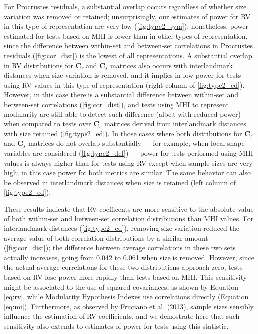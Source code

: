 \documentclass[12pt,]{article}
\begin{document}
For Procrustes residuals, a substantial overlap occurs regardless of
whether size variation was removed or retained; unsurprisingly, our
estimates of power for RV in this type of representation are very low
(\autoref{fig:type2_sym}); nonetheless, power estimated for tests based
on MHI is lower than in other types of representation, since the
difference between within-set and between-set correlations in Procrustes
residuals (\autoref{fig:cor_dist}) is the lowest of all representations.
A substantial overlap in RV distributions for $\mathbf{C}_r$ and
$\mathbf{C}_s$ matrices also occurs with interlandmark distances when
size variation is removed, and it implies in low power for tests using
RV values in this type of representation (right column of
\autoref{fig:type2_ed}). However, in this case there is a substantial
difference between within-set and between-set correlations
(\autoref{fig:cor_dist}), and tests using MHI to represent modularity
are still able to detect such difference (albeit with reduced power)
when compared to tests over $\mathbf{C}_s$ matrices derived from
interlandmark distances with size retained (\autoref{fig:type2_ed}). In
those cases where both distributions for $\mathbf{C}_r$ and
$\mathbf{C}_s$ matrices do not overlap substantially --- for example,
when local shape variables are considered (\autoref{fig:type2_def}) ---
power for tests performed using MHI values is always higher than for
tests using RV except when sample sizes are very high; in this case
power for both metrics are similar. The same behavior can also be
observed in interlandmark distances when size is retained (left column
of \autoref{fig:type2_ed}).

These results indicate that RV coefficents are more sensitive to the
absolute value of both within-set and between-set correlation
distributions than MHI values. For interlandmark distances
(\autoref{fig:type2_ed}), removing size variation reduced the average
value of both correlation distributions by a similar amount
(\autoref{fig:cor_dist}); the difference between average correlations in
these two sets actually increases, going from 0.042 to 0.061 when size
is removed. However, since the actual average correlations for these two
distributions approach zero, tests based on RV lose power more rapidly
than tests based on MHI. This sensitivity might be associated to the use
of squared covariances, as shown by Equation \ref{eq:rv}, while
Modularity Hypothesis Indexes use correlations directly (Equation
\ref{eq:mi}). Furthermore, as observed by Fruciano et al. (2013), sample
sizes sensibly influence the estimation of RV coefficients, and we
demostrate here that such sensitivity also extends to estimates of power
for tests using this statistic.
\end{document}
